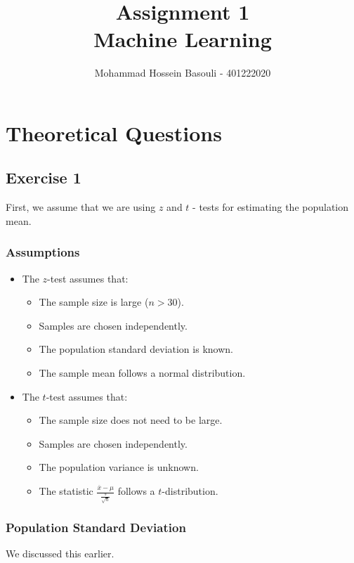 \documentclass{article}
\title{Assignment 1 \\ Machine Learning}
\author{Mohammad Hossein Basouli - 401222020}
\date{}
\begin{document}
\maketitle

\section*{Theoretical Questions}
\subsection*{Exercise 1}
First, we assume that we are using \( z \) and \( t \) - tests for estimating the population mean.

\subsubsection*{Assumptions}
\begin{itemize}
    \item The \( z \)-test assumes that:
    \begin{itemize}
        \item The sample size is large (\( n > 30 \)).
        \item Samples are chosen independently.
        \item The population standard deviation is known.
        \item The sample mean follows a normal distribution.
    \end{itemize}
    \item The \( t \)-test assumes that:
    \begin{itemize}
        \item The sample size does not need to be large.
        \item Samples are chosen independently.
        \item The population variance is unknown.
        \item The statistic \( \frac{\overline{x} - \mu}{\frac{s}{\sqrt{n}}} \) follows a \( t \)-distribution.
    \end{itemize}
\end{itemize}

\subsubsection*{Population Standard Deviation}
We discussed this earlier.
\end{document}
